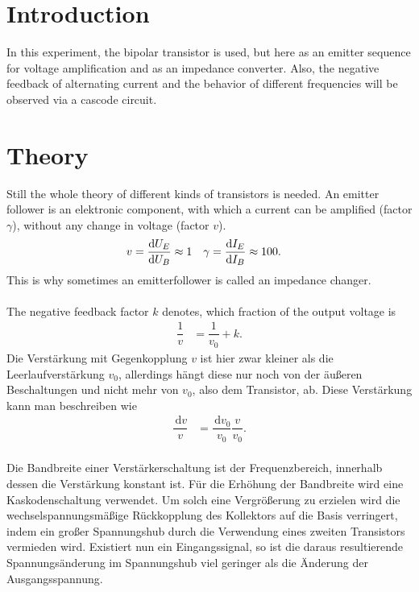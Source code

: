 \documentclass[a4paper,10pt]{article}
\newcommand{\td}{\,\text{d}}
\numberwithin{equation}{section}
\begin{document}
\begin{multicols}{2}
        \sloppy
        \section{Introduction}
        In this experiment, the bipolar transistor is used, but here as an emitter sequence for voltage amplification and as an impedance converter.
        Also, the negative feedback of alternating current and the behavior of different frequencies will be observed via a cascode circuit.

        \section{Theory}
        Still the whole theory of different kinds of transistors is needed.
        An emitter follower is an elektronic component, with which a current can be amplified (factor $\gamma $), without any change in voltage (factor $v$).
        \begin{align} 
                v &= \diff[]{U_E}{U_B}\approx 1 & \gamma &= \diff[]{I_E}{I_B}\approx 100
        .\end{align} 
        This is why sometimes an emitterfollower is called an impedance changer.
        \\\\ The negative feedback factor $k$ denotes, which fraction of the output voltage is 
        \begin{align} 
                \dfrac{1}{v} &= \dfrac{1}{v_0}+k
        .\end{align} 
        Die Verstärkung mit Gegenkopplung $v$ ist hier zwar kleiner als die Leerlaufverstärkung $v_0$, allerdings hängt diese nur noch von der äußeren Beschaltungen und nicht mehr von $v_0$, also dem Transistor, ab.
        Diese Verstärkung kann man beschreiben wie
        \begin{align} 
                \dfrac{\td v}{v} &= \dfrac{\td v_0}{v_0}\dfrac{v}{v_0}
        .\end{align} 
        \\Die Bandbreite einer Verstärkerschaltung ist der Frequenzbereich, innerhalb dessen die Verstärkung konstant ist.
        Für die Erhöhung der Bandbreite wird eine Kaskodenschaltung verwendet.
        Um solch eine Vergrößerung zu erzielen wird die wechselspannungsmäßige Rückkopplung des Kollektors auf die Basis verringert, indem ein großer Spannungshub durch die Verwendung eines zweiten Transistors vermieden wird.
        Existiert nun ein Eingangssignal, so ist die daraus resultierende Spannungsänderung im Spannungshub viel geringer als die Änderung der Ausgangsspannung.

\end{multicols}
\end{document}
